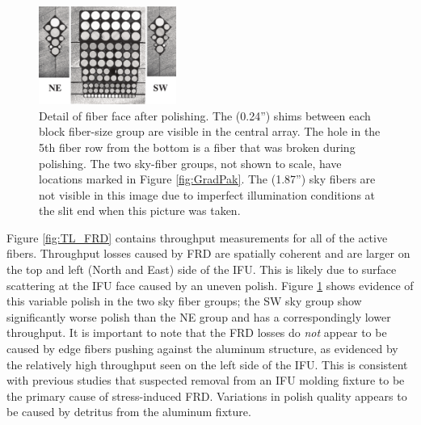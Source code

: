 \begin{appendices}
\begin{figure}
  \centering
  \includegraphics[width=0.4\textwidth]{891_1/figs/gradpak_facefig.pdf}
  \caption{\label{fig:gradpak_face}Detail of \GP fiber face after
    polishing. The  (0.24'') shims between each block
    fiber-size group are visible in the central array. The hole in the
    5th fiber row from the bottom is a fiber that was broken during
    polishing. The two sky-fiber groups, not shown to scale, have
    locations marked in Figure \ref{fig:GradPak}.  The  (1.87'') sky fibers are not visible in this image due to
    imperfect illumination conditions at the slit end when this
    picture was taken.}
\end{figure}

Figure \ref{fig:TL_FRD} contains throughput measurements for all of
the active \GP fibers. Throughput losses caused by FRD are spatially
coherent and are larger on the top and left (North and East) side of
the IFU. This is likely due to surface scattering at the IFU face
\citep{Eigenbrot12} caused by an uneven polish. Figure
\ref{fig:gradpak_face} shows evidence of this variable polish in the
two sky fiber groups; the SW sky group show significantly worse polish
than the NE group and has a correspondingly lower throughput. It is
important to note that the FRD losses do \emph{not} appear to be
caused by edge fibers pushing against the aluminum structure, as
evidenced by the relatively high throughput seen on the left side of
the IFU. This is consistent with previous studies \citep{Bershady04}
that suspected removal from an IFU molding fixture to be the primary
cause of stress-induced FRD. Variations in polish quality appears to
be caused by detritus from the aluminum fixture.


\end{appendices}
